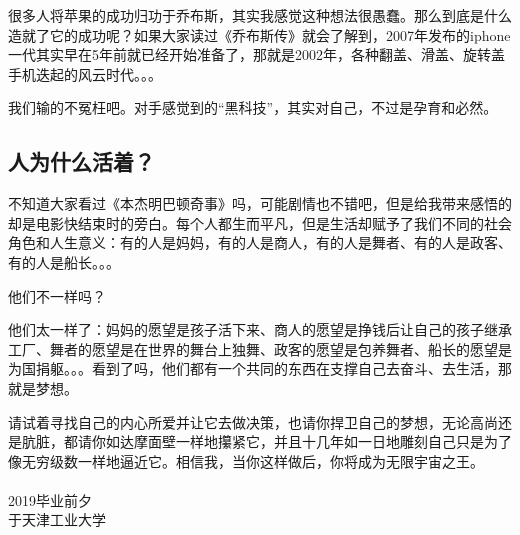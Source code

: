 \documentclass[UTF8]{ctexbook}
\begin{document}
很多人将苹果的成功归功于乔布斯，其实我感觉这种想法很愚蠢。那么到底是什么造就了它的成功呢？如果大家读过《乔布斯传》就会了解到，2007年发布的iphone一代其实早在5年前就已经开始准备了，那就是2002年，各种翻盖、滑盖、旋转盖手机迭起的风云时代。。。

我们输的不冤枉吧。对手感觉到的“黑科技”，其实对自己，不过是孕育和必然。

\subsection*{人为什么活着？}
不知道大家看过《本杰明巴顿奇事》吗，可能剧情也不错吧，但是给我带来感悟的却是电影快结束时的旁白。每个人都生而平凡，但是生活却赋予了我们不同的社会角色和人生意义：有的人是妈妈，有的人是商人，有的人是舞者、有的人是政客、有的人是船长。。。

他们不一样吗？

他们太一样了：妈妈的愿望是孩子活下来、商人的愿望是挣钱后让自己的孩子继承工厂、舞者的愿望是在世界的舞台上独舞、政客的愿望是包养舞者、船长的愿望是为国捐躯。。。看到了吗，他们都有一个共同的东西在支撑自己去奋斗、去生活，那就是梦想。

\hspace{2cm}

请试着寻找自己的内心所爱并让它去做决策，也请你捍卫自己的梦想，无论高尚还是肮脏，都请你如达摩面壁一样地攥紧它，并且十几年如一日地雕刻自己只是为了像无穷级数一样地逼近它。相信我，当你这样做后，你将成为无限宇宙之王。\\
\hspace{4cm}\\
\noindent2019毕业前夕\\
于天津工业大学
\end{document}
